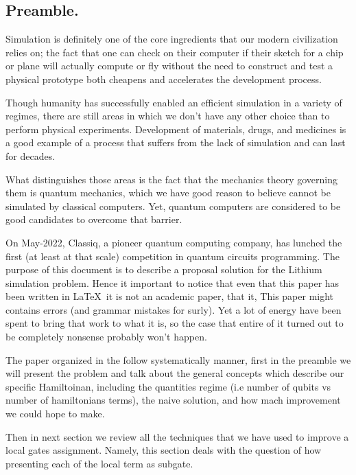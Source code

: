\documentclass{article}
\begin{document}
\begin{multicols*}{2}

\section{Preamble.}
Simulation is definitely one of the core ingredients that our modern civilization relies on; the fact that one can check on their computer if their sketch for a chip or plane will actually compute or fly without the need to construct and test a physical prototype both cheapens and accelerates the development process. 

Though humanity has successfully enabled an efficient simulation in a variety of regimes, there are still areas in which we don't have any other choice than to perform physical experiments. Development of materials, drugs, and medicines is a good example of a process that suffers from the lack of simulation and can last for decades.


What distinguishes those areas is the fact that the mechanics theory governing them is quantum mechanics, which we have good reason to believe cannot be simulated by classical computers. Yet, quantum computers are considered to be good candidates to overcome that barrier. 

On May-2022, Classiq, a pioneer quantum computing company, has lunched the first (at least at that scale) competition in quantum circuits programming. The purpose of this document is to describe a proposal solution for the Lithium simulation problem. Hence it important to notice that even that this paper has been written in \LaTeX \ it is not an academic paper, that it, This paper might contains errors (and grammar mistakes for surly). Yet a lot of energy have been spent to bring that work to what it is, so the case that entire of it turned out to be completely nonsense probably won't happen. 

The paper organized in the follow systematically manner, first in the preamble we will present the problem and talk about the general concepts which describe our specific Hamiltoinan, including the quantities regime (i.e number of qubits vs number of hamiltonians terms), the naive solution, and how mach improvement we could hope to make.     


Then in next section we review all the techniques that we have used to improve a  local gates assignment. Namely, this section deals with the question of how presenting each of the local term as subgate. 


\end{multicols*}
\end{document}
